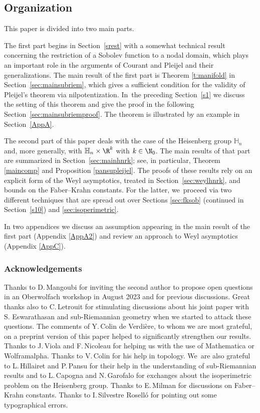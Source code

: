 \subsection{Organization}
This paper is divided into two main parts.

The first part begins in Section~\ref{srest} with a somewhat technical result concerning the restriction of a Sobolev function to a nodal domain, which plays an important role in the arguments of Courant and Pleijel and their generalizations. The main result of the first part is Theorem \ref{t:manifold} in Section~\ref{sec:mainsubriem}, which gives a sufficient condition for the validity of Pleijel's theorem via nilpotentization. In~the preceding Section~\ref{s1} we discuss the setting of this theorem and give the proof in the following Section~\ref{sec:mainsubriemproof}. The theorem is illustrated by an example in Section~\ref{AppA}.

The second part of this paper deals with the case of the Heisenberg group $\mathbb H_n$ and, more generally, with $\mathbb H_n\times\R^k$ with $k\in\N_0$. The main results of that part are summarized in Section~\ref{sec:mainhnrk}; see, in particular, Theorem \ref{maincomp} and Proposition \ref{pansupleijel}. The proofs of these results rely on an explicit form of the Weyl asymptotics, treated in Section~\ref{sec:weylhnrk}, and bounds on the Faber--Krahn constants. For the latter, we~proceed via two different techniques that are spread out over Sections \ref{sec:fksob} (continued in Section~\ref{s10}) and \ref{sec:isoperimetric}.

In two appendices we discuss an assumption appearing in the main result of the first part (Appendix \ref{AppA2}) and review an approach to Weyl asymptotics (Appendix \ref{AppC}).

\subsubsection*{Acknowledgements}
Thanks to D.\,Mangoubi for inviting the second author to propose open questions in an Oberwolfach workshop in August 2023 and for previous discussions. Great thanks also to C.\,Letrouit for stimulating discussions about his joint paper with S. Eswarathasan and sub-Riemannian geometry when we started to attack these questions. The comments of Y.\,Colin de Verdière, to whom we are most grateful, on a preprint version \cite{FrHe1} of this paper helped to significantly strengthen our results. Thanks to J.\,Viola and F.\,Nicoleau for helping us with the use of Mathematica or Wolframalpha. Thanks to V.\,Colin for his help in topology. We~are also grateful to L.\,Hillairet and P.\,Pansu for their help in the understanding of sub-Riemannian results and to L.\,Capogna and N.\,Garofalo for exchanges about the isoperimetric problem on the Heisenberg group. Thanks to E.\,Milman for discussions on Faber--Krahn constants. Thanks to I.\,Silvestre Roselló for pointing out some typographical errors.

